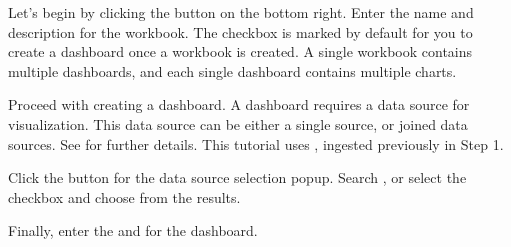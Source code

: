 \documentclass[letterpaper,10pt,english]{sphinxmanual}
\begin{document}
Let’s begin by clicking the  button on the bottom right. Enter the name and description for the workbook. The checkbox is marked by default for you to create a dashboard once a workbook is created. A single workbook contains multiple dashboards, and each single dashboard contains multiple charts.
\begin{quote}

\begin{figure}[H]
\centering

\noindent{}
\end{figure}
\end{quote}

Proceed with creating a dashboard. A dashboard requires a data source for visualization. This data source can be either a single source, or joined data sources. See {\hyperref[\detokenize{discovery/part04/create_a_dashboard::doc}]{}} for further details. This tutorial uses , ingested previously in Step 1.
\begin{quote}

\begin{figure}[H]
\centering

\noindent{}
\end{figure}
\end{quote}

Click the  button for the data source selection popup. Search , or select the  checkbox and choose from the results.
\begin{quote}

\begin{figure}[H]
\centering

\noindent{}
\end{figure}
\end{quote}

Finally, enter the  and  for the dashboard.
\begin{quote}

\begin{figure}[H]
\centering

\noindent{}
\end{figure}
\end{quote}
\end{document}
